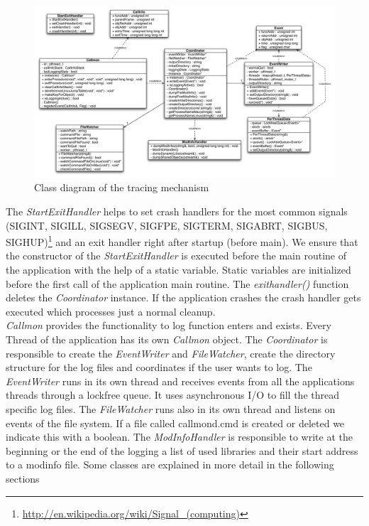 \begin{figure}[ht]
\centering
\includegraphics[width=18cm]{images/callmon_class_diagram}
\caption{Class diagram of the tracing mechanism}\label{fig:unixfe_figure1}
\end{figure}

The \emph{StartExitHandler} helps to set crash handlers for the most common signals (SIGINT, SIGILL, SIGSEGV, SIGFPE, SIGTERM, SIGABRT, SIGBUS, SIGHUP)\footnote{\url{http://en.wikipedia.org/wiki/Signal_(computing)}} and an exit handler right after startup (before main). We ensure that the constructor of the \emph{StartExitHandler} is executed before the main routine of the application with the help of a static variable. Static variables are initialized before the first call of the application main routine. The \emph{exithandler()} function deletes the \emph{Coordinator} instance. If the application crashes the crash handler gets executed which processes just a normal cleanup.\\

\emph{Callmon} provides the functionality to log function enters and exists. Every Thread of the application has its own \emph{Callmon} object. The \emph{Coordinator} is responsible to create the \emph{EventWriter} and \emph{FileWatcher}, create the directory structure for the log files and coordinates if the user wants to log. The \emph{EventWriter} runs in its own thread and receives events from all the applications threads through a lockfree queue. It uses asynchronous I/O to fill the thread specific log files. The \emph{FileWatcher} runs also in its own thread and listens on events of the file system. If a file called callmond.cmd is created or deleted we indicate this with a boolean. The \emph{ModInfoHandler} is responsible to write at the beginning or the end of the logging a list of used libraries and their start address to a modinfo file. Some classes are explained in more detail in the following sections\\

